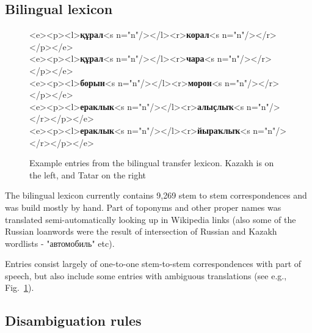 \documentclass[11pt]{article}
\begin{document}
\subsection{Bilingual lexicon}

	
\begin{figure}[htbp]
\begin{texttt}
    <e><p><l>\textbf{құрал}<s n="n"/></l><r>\textbf{корал}<s n="n"/></r></p></e> \\
    <e><p><l>\textbf{құрал}<s n="n"/></l><r>\textbf{чара}<s n="n"/></r></p></e> \\
    <e><p><l>\textbf{борын}<s n="n"/></l><r>\textbf{морон}<s n="n"/></r></p></e> \\
    <e><p><l>\textbf{ераклык}<s n="n"/></l><r>\textbf{алы{\qipa ҫ}лы{\qipa ҡ}}<s n="n"/></r></p></e> \\
    <e><p><l>\textbf{ераклык}<s n="n"/></l><r>\textbf{йыра{\qipa ҡ}лы{\qipa ҡ}}<s n="n"/></r></p></e>
\end{texttt}
\caption{Example entries from the bilingual transfer lexicon. Kazakh is on the left, and Tatar on the right}
\label{fig:bidix}
\end{figure}

The bilingual lexicon currently contains 9,269 stem to stem correspondences and was build mostly by hand. Part of toponyms and other proper names was translated semi-automatically looking up in Wikipedia links (also some of the Russian loanwords were the result of intersection of Russian and Kazakh wordlists - "автомобиль" etc).   

Entries consist largely of one-to-one stem-to-stem correspondences with part of speech, but also
include some entries with ambiguous translations (see e.g., Fig.~\ref{fig:bidix}).

\subsection{Disambiguation rules}
\end{document}
